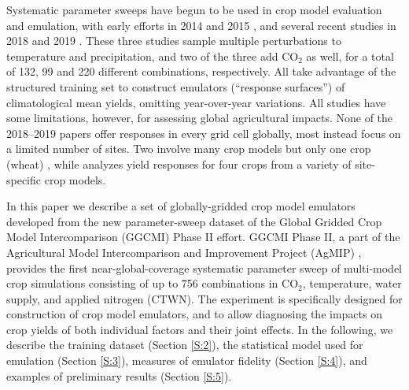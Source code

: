 \documentclass[gmd, manuscript]{copernicus} %
\begin{document}
Systematic parameter sweeps have begun to be used in crop model evaluation and emulation, with early efforts in 2014 and 2015 \citep{ruane2014, Markowski2015, Pirttioja2015}, and several recent studies in 2018 and 2019 \citep{FRONZEK20182, RUIZRAMOS2018,Snyder2018}. 
These three studies sample multiple perturbations to temperature and precipitation, and two of the three add CO$_2$ as well, for a total of 132, 99 and 220 different combinations, respectively. 
All take advantage of the structured training set to construct emulators (``response surfaces'') of climatological mean yields, omitting year-over-year variations. 
All studies have some limitations, however, for assessing global agricultural impacts. 
None of the 2018--2019 papers offer responses in every grid cell globally, most instead focus on a limited number of sites.
Two involve many crop models but only one crop (wheat) \citep{FRONZEK20182,RUIZRAMOS2018}, while \citet{Snyder2018} analyzes yield responses for four crops from a variety of site-specific crop models. %

In this paper we describe a set of globally-gridded crop model emulators developed from the new parameter-sweep dataset of the Global Gridded Crop Model Intercomparison (GGCMI) Phase II effort. 
GGCMI Phase II, a part of the Agricultural Model Intercomparison and Improvement Project (AgMIP) \citep{ROSENZWEIG2013, Rosenzweig2014}, provides the first near-global-coverage systematic parameter sweep of multi-model crop simulations consisting of up to 756 combinations in CO$_2$, temperature, water supply, and applied nitrogen (CTWN). 
The experiment is specifically designed for construction of crop model emulators, and to allow diagnosing the impacts on crop yields of both individual factors and their joint effects.
In the following, we describe the training dataset (Section \ref{S:2}), the statistical model used for emulation (Section \ref{S:3}), measures of emulator fidelity (Section \ref{S:4}), and examples of preliminary results (Section \ref{S:5}). 
\end{document}
